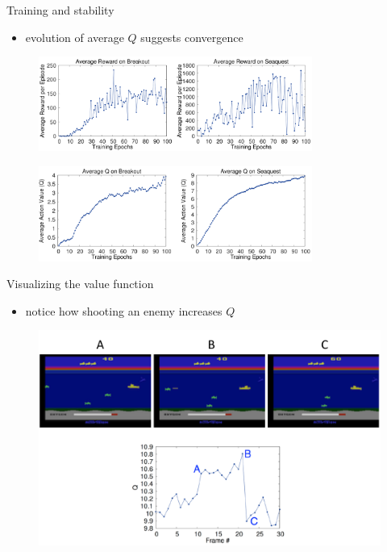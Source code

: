 \begin{frame}{Training and stability}
    \begin{itemize}\itemsep=12pt

        \item evolution of average $Q$ suggests convergence
    
    \end{itemize}
    \begin{figure}
        \centering
        \includegraphics[width=0.8\textwidth]{stab-1.png}
    \end{figure}
    \begin{figure}
        \centering
        \includegraphics[width=0.8\textwidth]{stab-2.png}
    \end{figure}
\end{frame}

\begin{frame}{Visualizing the value function}
    \begin{itemize}\itemsep=12pt

        \item notice how shooting an enemy increases $Q$
    
    \end{itemize}
    \begin{figure}
        \centering
        \includegraphics[width=\textwidth]{viz.pdf}
    \end{figure}
\end{frame}


